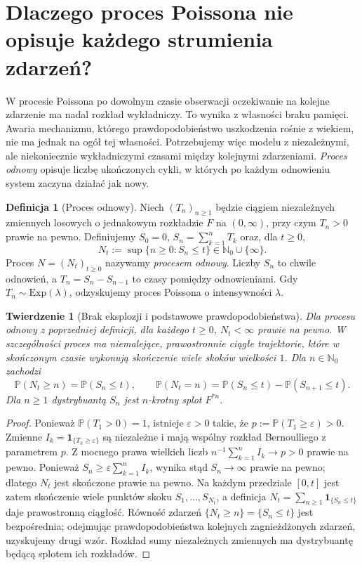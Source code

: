 \documentclass[11pt,a4paper,oneside]{report}
\numberwithin{equation}{chapter}
\theoremstyle{plain}
\newtheorem{twierdzenie}{Twierdzenie}[chapter]
\theoremstyle{definition}
\newtheorem{definicja}{Definicja}[chapter]
\theoremstyle{remark}
\newcommand{\N}{\mathbb{N}}
\newcommand{\Prob}{\mathbb{P}}
\newcommand{\ind}[1]{\mathbf{1}_{#1}}
\begin{document}
\section{Dlaczego proces Poissona nie opisuje każdego strumienia zdarzeń?}
W procesie Poissona po dowolnym czasie obserwacji oczekiwanie na
kolejne zdarzenie ma nadal rozkład wykładniczy. To wynika z własności
braku pamięci. Awaria mechanizmu, którego prawdopodobieństwo
uszkodzenia rośnie z wiekiem, nie ma jednak na ogół tej własności.
Potrzebujemy więc modelu z niezależnymi, ale niekoniecznie
wykładniczymi czasami między kolejnymi zdarzeniami.
\emph{Proces odnowy} opisuje liczbę ukończonych cykli, w których
po każdym odnowieniu system zaczyna działać jak nowy.

\begin{definicja}[Proces odnowy]
Niech $(T_n)_{n\ge1}$ będzie ciągiem niezależnych zmiennych
losowych o jednakowym rozkładzie $F$ na $(0,\infty)$, przy czym
$T_n>0$ prawie na pewno. Definiujemy $S_0=0$,
$S_n=\sum_{k=1}^nT_k$ oraz, dla $t\ge0$,
\[
N_t:=\sup\{n\ge0:S_n\le t\}\in\N_0\cup\{\infty\}.
\]
Proces $N=(N_t)_{t\ge0}$ nazywamy \emph{procesem odnowy}.
Liczby $S_n$ to chwile odnowień, a $T_n=S_n-S_{n-1}$
to czasy pomiędzy odnowieniami. Gdy $T_n\sim\mathrm{Exp}(\lambda)$,
odzyskujemy proces Poissona o intensywności $\lambda$.
\end{definicja}

\begin{twierdzenie}[Brak eksplozji i podstawowe prawdopodobieństwa]
Dla procesu odnowy z poprzedniej definicji, dla każdego $t\ge0$,
$N_t<\infty$ prawie na pewno. W szczególności proces ma
niemalejące, prawostronnie ciągłe trajektorie, które w skończonym
czasie wykonują skończenie wiele skoków wielkości $1$.
Dla $n\in\N_0$ zachodzi
\[
\Prob(N_t\ge n)=\Prob(S_n\le t),\qquad
\Prob(N_t=n)=\Prob(S_n\le t)-\Prob(S_{n+1}\le t).
\]
Dla $n\ge1$ dystrybuantą $S_n$ jest $n$-krotny splot $F^{*n}$.
\end{twierdzenie}
\begin{proof}
Ponieważ $\Prob(T_1>0)=1$, istnieje $\varepsilon>0$
takie, że $p:=\Prob(T_1\ge\varepsilon)>0$.
Zmienne $I_k=\ind{\{T_k\ge\varepsilon\}}$ są niezależne
i mają wspólny rozkład Bernoulliego z parametrem $p$.
Z mocnego prawa wielkich liczb
$n^{-1}\sum_{k=1}^n I_k\to p>0$ prawie na pewno.
Ponieważ $S_n\ge\varepsilon\sum_{k=1}^nI_k$, wynika stąd
$S_n\to\infty$ prawie na pewno; dlatego $N_t$ jest skończone
prawie na pewno. Na każdym przedziale $[0,t]$ jest zatem
skończenie wiele punktów skoku $S_1,\dots,S_{N_t}$,
a definicja $N_t=\sum_{n\ge1}\ind{\{S_n\le t\}}$
daje prawostronną ciągłość.
Równość zdarzeń $\{N_t\ge n\}=\{S_n\le t\}$ jest bezpośrednia;
odejmując prawdopodobieństwa kolejnych zagnieżdżonych zdarzeń,
uzyskujemy drugi wzór. Rozkład sumy niezależnych zmiennych
ma dystrybuantę będącą splotem ich rozkładów.
\end{proof}
\end{document}
